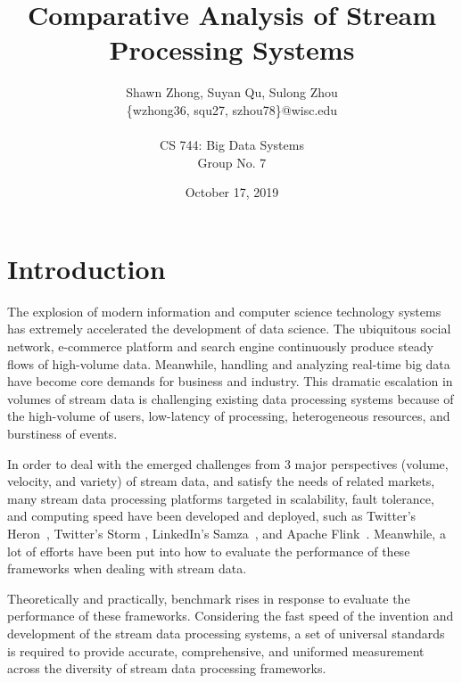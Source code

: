 \documentclass[pdftex,twocolumn,10pt,letterpaper]{article}
\begin{document}
\title{ Comparative Analysis of Stream Processing Systems }
\author{
    Shawn Zhong, Suyan Qu, Sulong Zhou \\
    \{wzhong36, squ27, szhou78\}@wisc.edu\\
    \\
    CS 744: Big Data Systems \\
    Group No. 7
}
\date{October 17, 2019}


\maketitle

\section{Introduction}
The explosion of modern information and computer science technology systems has extremely accelerated the development of data science. The ubiquitous social network, e-commerce platform and search engine continuously produce steady flows of high-volume data\cite{mcafee2012big}. Meanwhile, handling and analyzing real-time big data have become core demands for business and industry. This dramatic escalation in volumes of stream data is challenging existing data processing systems because of the high-volume of users, low-latency of processing, heterogeneous resources, and burstiness of events.  

In order to deal with the emerged challenges from 3 major perspectives (volume, velocity, and variety) of stream data\cite{birke2014big}, and satisfy the needs of related markets, many stream data processing platforms targeted in scalability, fault tolerance, and computing speed have been developed and deployed, such as Twitter’s Heron~\cite{Kulkarni:2015:THS:2723372.2742788}, Twitter's Storm \cite{toshniwal2014storm}, LinkedIn’s Samza~\cite{Noghabi:2017:SSS:3137765.3137770}, and Apache Flink~\cite{Carbone2015ApacheFS}. Meanwhile, a lot of efforts have been put into how to evaluate the performance of these frameworks when dealing with stream data. 

Theoretically and practically, benchmark rises in response to evaluate the performance of these frameworks. Considering the fast speed of the invention and development of the stream data processing systems, a set of universal standards is required to provide accurate, comprehensive, and uniformed measurement across the diversity of stream data processing frameworks. 
\end{document}
